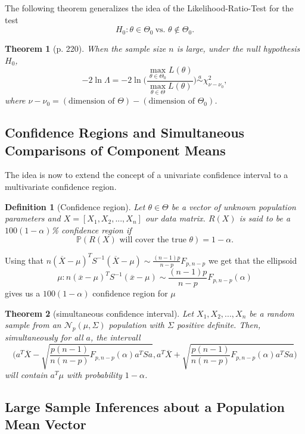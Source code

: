 \documentclass[a4paper]{article}
\newtheorem*{theorem}{Theorem}
\newtheorem*{defi}{Definition}
\begin{document}
The following theorem generalizes the idea of the Likelihood-Ratio-Test for the test 
$$ H_0: \theta \in \Theta_0 ~\text{vs. } \theta \notin \Theta_0.$$

\begin{theorem}[p. 220]

When the sample size $n$ is large, under the null hypothesis $H_0$, $$-2\ln\Lambda = -2\ln\biggl(\frac{\max\limits_{\theta \in \Theta_0}L(\theta)}{\max\limits_{\theta\in \Theta}L(\theta)}\biggr)\overset{a}{\sim}\chi_{\nu-\nu_0}^2, $$ where $\nu-\nu_0=(\text{dimension of }\Theta)-(\text{dimension of }\Theta_0)$.	
\end{theorem}

\subsection*{Confidence Regions and Simultaneous Comparisons of Component Means}

The idea is now to extend the concept of a univariate confidence interval to a multivariate confidence region. 

\begin{defi}[Confidence region]
	Let $\theta\in\Theta$ be a vector of unknown population parameters and $X= [X_1, X_2, ..., X_n]$ our data matrix. $R(X)$ is said to be a $100(1-\alpha)$\% confidence region if $$\mathbb{P}(R(X)\text{ will cover the true }\theta)=1-\alpha.$$
\end{defi}

Using that $n(\overline{X}-\mu)^TS^{-1}(\overline{X}-\mu)\sim\frac{(n-1)p}{n-p}F_{p, n-p}$ we get that the ellipsoid
$${\mu: n(\overline{x}-\mu)^TS^{-1}(\overline{x}-\mu)\sim\frac{(n-1)p}{n-p}F_{p, n-p}(\alpha)}$$ gives us a $100(1-\alpha)$ confidence region for $\mu$

\begin{theorem}[simultaneous confidence interval]
	Let $X_1, X_2, ..., X_n$ be a random sample from an $\mathcal{N}_p(\mu, \Sigma)$ population with $\Sigma$ positive definite. Then, simultaneously for all $a$, the intervall
	$$\biggl(a^T\overline{X}-\sqrt{\frac{p(n-1)}{n(n-p)}F_{p, n-p}(\alpha)a^TSa}, a^T\overline{X}+\sqrt{\frac{p(n-1)}{n(n-p)}F_{p, n-p}(\alpha)a^TSa}\biggr)$$ will contain $a^T\mu$ with probability $1-\alpha$.
\end{theorem}

\subsection*{Large Sample Inferences about a Population Mean Vector}
\end{document}
